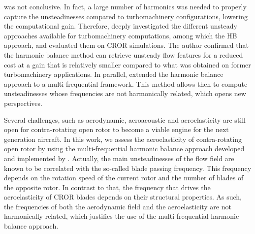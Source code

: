 was not conclusive. In fact, a large number of 
harmonics was needed to properly capture the unsteadinesses
compared to turbomachinery configurations, lowering
the computational gain.
Therefore, \citet{ThesisFrancois} deeply
investigated the different unsteady approaches available 
for turbomachinery computations, among which the HB approach, 
and evaluated them on CROR simulations. 
The author confirmed that
the harmonic balance method can retrieve unsteady
flow features for a reduced cost at a gain that
is relatively smaller compared to what was
obtained on former turbomachinery applications.
In parallel, \citet{ThesisGuedeney} extended the harmonic
balance approach to a multi-frequential framework. 
This method allows then to compute unsteadinesses whose frequencies
are not harmonically related, which opens new perspectives.
\newline

Several challenges, such as aerodynamic,
aeroacoustic and aeroelasticity are still open 
for contra-rotating open rotor
to become a viable engine for the next generation aircraft.
In this work, we assess the aeroelasticity of 
contra-rotating open rotor by using the multi-frequential
harmonic balance approach developed and implemented 
by \citet{ThesisGuedeney}.
Actually, the main unsteadinesses of the flow field
are known to be correlated with the so-called
blade passing frequency. This frequency depends on the
rotation speed of the current rotor and the number
of blades of the opposite rotor. In contrast to that, the 
frequency that drives the aeroelasticity of CROR
blades depends on their structural properties.
As such, the frequencies of both the aerodynamic
field and the aeroelasticity are not harmonically
related, which justifies the use of the multi-frequential
harmonic balance approach.
\newline

